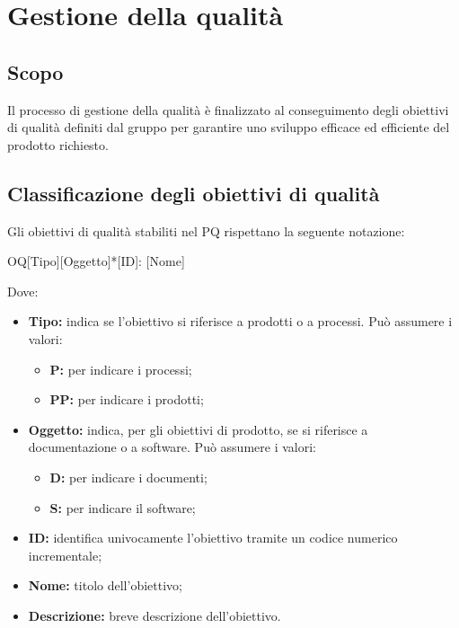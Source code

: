 \documentclass[../NormediProgetto.tex]{subfiles}
\begin{document}

\section{Gestione della qualità}

\subsection{Scopo}
Il processo di gestione della qualità è finalizzato al conseguimento degli obiettivi di qualità definiti dal gruppo per garantire uno sviluppo efficace ed efficiente del prodotto richiesto.

\subsection{Classificazione degli obiettivi di qualità}

Gli obiettivi di qualità stabiliti nel PQ rispettano la seguente notazione:

    \begin{center}
        OQ[Tipo][Oggetto]*[ID]: [Nome]
    \end{center}
    
Dove:

\begin{itemize}
    \item \textbf{Tipo:} indica se l'obiettivo si riferisce a prodotti o a processi. Può assumere i valori:
    
    \begin{itemize}
        \item \textbf{P:} per indicare i processi;
        \item \textbf{PP:} per indicare i prodotti;
    \end{itemize}
    
    \item \textbf{Oggetto:} indica, per gli obiettivi di prodotto, se si riferisce a documentazione o a software. Può assumere i valori:
    
    \begin{itemize}
        \item \textbf{D:} per indicare i documenti;
        \item \textbf{S:} per indicare il software;
    \end{itemize}
    
    \item \textbf{ID:} identifica univocamente l'obiettivo tramite un codice numerico incrementale;
    
    \item \textbf{Nome:} titolo dell'obiettivo;
    
    \item \textbf{Descrizione:} breve descrizione dell'obiettivo.
\end{itemize}
\end{document}
